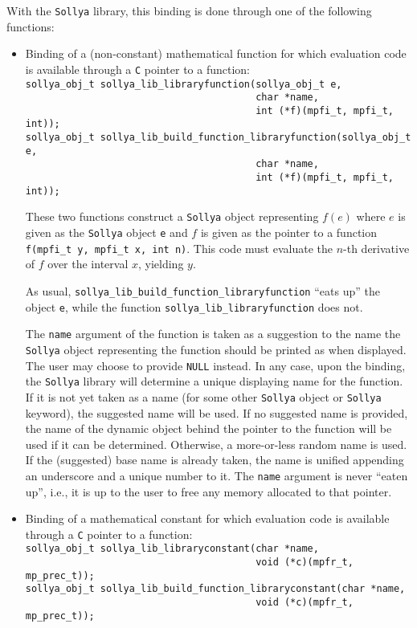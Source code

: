 \documentclass[a4paper]{article}
\newcommand{\sollya}{\texttt{Sollya}\xspace}
\begin{document}
With the \sollya library, this binding is done through one of the
following functions:
\begin{itemize}
\item Binding of a (non-constant) mathematical function for which evaluation 
code is available through a {\tt C} pointer to a function: \\
\verb|sollya_obj_t sollya_lib_libraryfunction(sollya_obj_t e, | \\
\verb|                                        char *name, | \\
\verb|                                        int (*f)(mpfi_t, mpfi_t, int));| \\
\verb|sollya_obj_t sollya_lib_build_function_libraryfunction(sollya_obj_t e, | \\
\verb|                                        char *name, | \\
\verb|                                        int (*f)(mpfi_t, mpfi_t, int));| 

These two functions construct a \sollya object representing $f(e)$
where $e$ is given as the \sollya object {\tt e} and $f$ is given as
the pointer to a function \verb|f(mpfi_t y, mpfi_t x, int n)|. This
code must evaluate the $n$-th derivative of $f$ over the interval $x$,
yielding $y$. 

As usual, \verb|sollya_lib_build_function_libraryfunction| ``eats up''
the object {\tt e}, while the function
\verb|sollya_lib_libraryfunction| does not.

The \verb|name| argument of the function is taken as a suggestion to
the name the \sollya object representing the function should be
printed as when displayed. The user may choose to provide \verb|NULL|
instead.  In any case, upon the binding, the \sollya library will
determine a unique displaying name for the function. If it is not yet
taken as a name (for some other \sollya object or \sollya keyword),
the suggested name will be used. If no suggested name is provided, the
name of the dynamic object behind the pointer to the
function will be used if it can be determined. Otherwise, a
more-or-less random name is used. If the (suggested) base name is
already taken, the name is unified appending an underscore and a
unique number to it. The \verb|name| argument is never ``eaten up'',
i.e., it is up to the user to free any memory allocated to that
pointer.

\item Binding of a mathematical constant for which evaluation code is 
available through a {\tt C} pointer to a function: \\
\verb|sollya_obj_t sollya_lib_libraryconstant(char *name, | \\
\verb|                                        void (*c)(mpfr_t, mp_prec_t));| \\
\verb|sollya_obj_t sollya_lib_build_function_libraryconstant(char *name, | \\
\verb|                                        void (*c)(mpfr_t, mp_prec_t));| 


\end{itemize}
\end{document}
